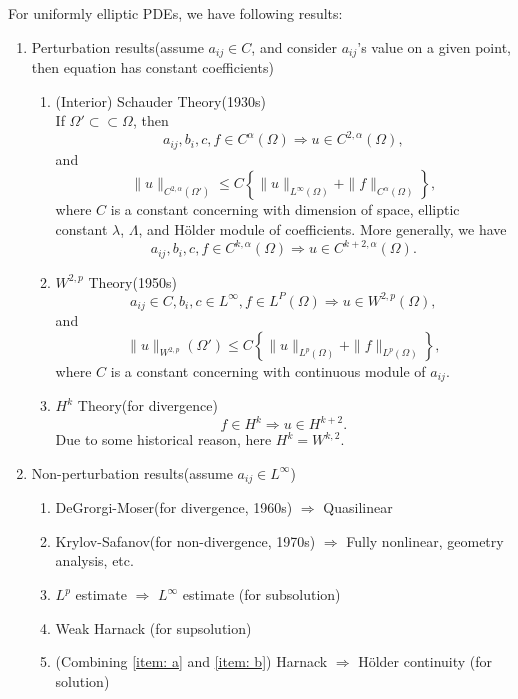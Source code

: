 \documentclass[12pt]{article}
\begin{document}
For uniformly elliptic PDEs, we have following results:
\begin{enumerate}
\item Perturbation results(assume $a_{ij}\in C$, and consider $a_{ij}$'s value on a given point, then equation has constant coefficients)
\begin{enumerate}
\item (Interior) Schauder Theory(1930s)\\
If $\Omega' \subset\subset \Omega$, then
\[a_{ij}, b_i, c, f \in C^{\alpha}(\Omega) \Rightarrow u \in C^{2, \alpha}(\Omega),\]
and
\[\|u\|_{C^{2, \alpha}(\Omega')} \le C \left\{ \|u\|_{L^{\infty}(\Omega)} + \|f\|_{C^{\alpha}(\Omega)} \right\},\]
where $C$ is a constant concerning with dimension of space, elliptic constant $\lambda$, $\Lambda$, and H\"{o}lder module of coefficients.
More generally, we have
\[a_{ij}, b_i, c, f \in C^{k, \alpha}(\Omega) \Rightarrow u \in C^{k+2, \alpha}(\Omega).\]

\item $W^{2, p}$ Theory(1950s)\\
\[a_{ij}\in C, b_i, c \in L^{\infty}, f\in L^P(\Omega) \Rightarrow u \in W^{2, p}(\Omega),\]
and
\[\|u\|_{W^{2, p}}(\Omega') \le C\left\{ \|u\|_{L^p(\Omega)} + \|f\|_{L^p(\Omega)} \right\},\]
where $C$ is a constant concerning with continuous module of $a_{ij}$.

\item $H^k$ Theory(for divergence)\\
\[ f\in H^k \Rightarrow u \in H^{k+2} .\]
Due to some historical reason, here $H^k = W^{k, 2}$.
\end{enumerate}

\item Non-perturbation results(assume $a_{ij}\in L^\infty$)
\begin{enumerate}
	\item DeGrorgi-Moser(for divergence, 1960s) $\Rightarrow$ Quasilinear
	\item Krylov-Safanov(for non-divergence, 1970s) $\Rightarrow$ Fully nonlinear, geometry analysis, etc.
	\item\label{item: a} $L^p$ estimate $\Rightarrow$ $L^\infty$ estimate (for subsolution) 
	\item\label{item: b} Weak Harnack (for supsolution) 
	\item (Combining \ref{item: a} and \ref{item: b}) Harnack $\Rightarrow$ H\"{o}lder continuity (for solution)
\end{enumerate}
\end{enumerate}
\end{document}

